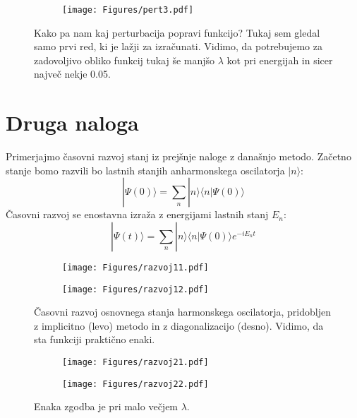 \documentclass{article}
\begin{document}
\begin{figure}[H]
\centering
\begin{subfigure}{.99\textwidth}
\texttt{[image: Figures/pert3.pdf]}
\end{subfigure}
\caption*{Kako pa nam kaj perturbacija popravi funkcijo? Tukaj sem gledal samo prvi red, ki je lažji za izračunati. Vidimo, da potrebujemo za zadovoljivo obliko funkcij tukaj še manjšo $\lambda$ kot pri energijah in sicer največ nekje 0.05.}
\end{figure}
\section*{Druga naloga}

Primerjajmo časovni razvoj stanj iz prejšnje naloge z današnjo metodo.
Začetno stanje bomo razvili bo lastnih stanjih anharmonskega oscilatorja $|n\rangle$:
\begin{equation*}
|\Psi(0) \rangle = \sum_n |n \rangle \langle n | \Psi(0) \rangle
\end{equation*}
Časovni razvoj se enostavna izraža z energijami lastnih stanj $E_n$:
\begin{equation*}
|\Psi(t) \rangle = \sum_n |n \rangle \langle n | \Psi(0) \rangle e^{-i E_n t}
\end{equation*}

\begin{figure}[H]
\centering
\begin{subfigure}{.49\textwidth}
\texttt{[image: Figures/razvoj11.pdf]}
\end{subfigure}
\begin{subfigure}{.49\textwidth}
\texttt{[image: Figures/razvoj12.pdf]}
\end{subfigure}
\caption*{Časovni razvoj osnovnega stanja harmonskega oscilatorja, pridobljen z implicitno (levo) metodo in z diagonalizacijo (desno). Vidimo, da sta funkciji praktično enaki.}
\end{figure}

\begin{figure}[H]
\centering
\begin{subfigure}{.49\textwidth}
\texttt{[image: Figures/razvoj21.pdf]}
\end{subfigure}
\begin{subfigure}{.49\textwidth}
\texttt{[image: Figures/razvoj22.pdf]}
\end{subfigure}
\caption*{Enaka zgodba je pri malo večjem $\lambda$.}
\end{figure}
\end{document}

